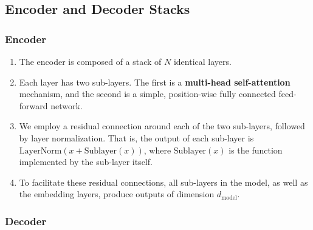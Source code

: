 \subsection{Encoder and Decoder Stacks}

\subsubsection*{Encoder}

\begin{enumerate}
    \item The encoder is composed of a stack of $N$ identical layers.
    \hfill \cite{arxiv/1706.03762/Attention-Is-All-You-Need}

    \item Each layer has two sub-layers. 
    The first is a \textbf{multi-head self-attention} mechanism, and 
    the second is a simple, position-wise fully connected feed-forward network.
    \hfill \cite{arxiv/1706.03762/Attention-Is-All-You-Need}

    \item We employ a residual connection around each of the two sub-layers, followed by layer normalization.
    That is, the output of each sub-layer is $\text{LayerNorm}(x + \text{Sublayer}(x))$, where $\text{Sublayer}(x)$ is the function implemented by the sub-layer itself. 
    \hfill \cite{arxiv/1706.03762/Attention-Is-All-You-Need}

    \item To facilitate these residual connections, all sub-layers in the model, as well as the embedding layers, produce outputs of dimension $d_{\text{model}}$.
    \hfill \cite{arxiv/1706.03762/Attention-Is-All-You-Need}
\end{enumerate}


\subsubsection*{Decoder}

